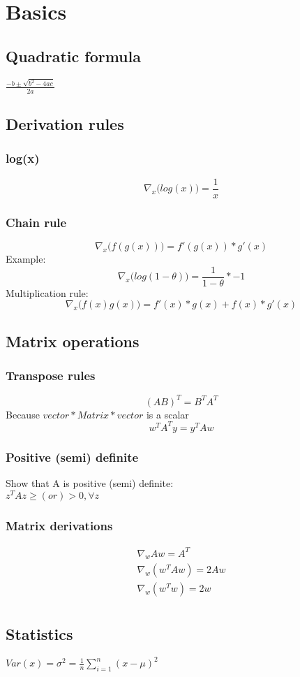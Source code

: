 \section{Basics}
\subsection{Quadratic formula}
$\frac{-b \pm \sqrt{b^{2}-4ac}}{2a}$
\subsection{Derivation rules}
\subsubsection{log(x)}
\begin{equation}
	\nabla_{x}\big( log(x) \big) = \frac{1}{x}
\end{equation}
\subsubsection{Chain rule}
\begin{equation}
	\nabla_{x}\big( f(g(x)) \big) = f'(g(x))*g'(x)
\end{equation}
Example:
\begin{equation}
	\nabla_{x}\big( log(1-\theta) \big) = \frac{1}{1-\theta}*- 1
\end{equation}
Multiplication rule:
\begin{equation}
	\nabla_{x}\big( f(x)g(x) \big) = f'(x)*g(x) + f(x)*g'(x)
\end{equation}
\subsection{Matrix operations}
\subsubsection{Transpose rules}
\begin{equation}
	(AB)^{T}= B^{T}A^{T}
\end{equation}
Because $vector * Matrix * vector$ is a scalar
\begin{equation}
	w^{T}A^{T}y = y^{T}Aw
\end{equation}
\subsubsection{Positive (semi) definite}
\small Show that A is positive (semi) definite:\\
$z^{T}Az \geq (or) > 0, \forall z$\\
\subsubsection{Matrix derivations}
\begin{equation}
	\begin{aligned}
		\nabla_{w}Aw = A^T\\ \nabla_w(w^{T}Aw) = 2Aw\\ \nabla_w(w^{T}w) = 2w\\
	\end{aligned}
\end{equation}
\subsection{Statistics}
$Var(x) = \sigma^{2}= \frac{1}{n}\sum_{i=1}^{n}(x-\mu)^{2}$